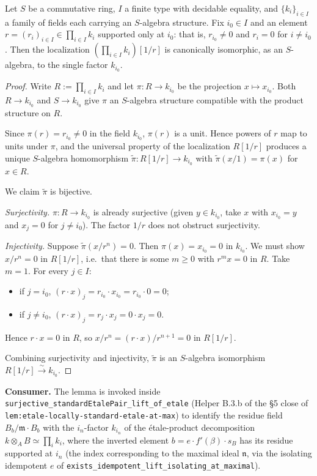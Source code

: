 \begin{theorem}
  \label{thm:localization-away-pi-field-supported-at}
  \leanok
  Let $S$ be a commutative ring, $I$ a finite type with decidable
  equality, and $\{k_i\}_{i \in I}$ a family of fields each carrying
  an $S$-algebra structure. Fix $i_0 \in I$ and an element
  $r = (r_i)_{i \in I} \in \prod_{i \in I} k_i$ supported only at
  $i_0$: that is, $r_{i_0} \neq 0$ and $r_i = 0$ for $i \neq i_0$.
  Then the localization $(\prod_{i \in I} k_i)[1/r]$ is canonically
  isomorphic, as an $S$-algebra, to the single factor $k_{i_0}$.
\end{theorem}
\begin{proof}
  \leanok
  Write $R := \prod_{i \in I} k_i$ and let $\pi : R \to k_{i_0}$ be the
  projection $x \mapsto x_{i_0}$. Both $R \to k_{i_0}$ and $S \to k_{i_0}$
  give $\pi$ an $S$-algebra structure compatible with the product
  structure on $R$.

  Since $\pi(r) = r_{i_0} \neq 0$ in the field $k_{i_0}$, $\pi(r)$ is a
  unit. Hence powers of $r$ map to units under $\pi$, and the universal
  property of the localization $R[1/r]$ produces a unique $S$-algebra
  homomorphism $\widetilde{\pi} : R[1/r] \to k_{i_0}$ with
  $\widetilde{\pi}(x/1) = \pi(x)$ for $x \in R$.

  We claim $\widetilde{\pi}$ is bijective.

  \emph{Surjectivity.} $\pi : R \to k_{i_0}$ is already surjective
  (given $y \in k_{i_0}$, take $x$ with $x_{i_0} = y$ and $x_j = 0$ for
  $j \neq i_0$). The factor $1/r$ does not obstruct surjectivity.

  \emph{Injectivity.} Suppose $\widetilde{\pi}(x/r^n) = 0$. Then
  $\pi(x) = x_{i_0} = 0$ in $k_{i_0}$. We must show $x/r^n = 0$ in
  $R[1/r]$, i.e.\ that there is some $m \geq 0$ with $r^m x = 0$ in $R$.
  Take $m = 1$. For every $j \in I$:
  \begin{itemize}
    \item if $j = i_0$, $(r \cdot x)_j = r_{i_0} \cdot x_{i_0} =
      r_{i_0} \cdot 0 = 0$;
    \item if $j \neq i_0$, $(r \cdot x)_j = r_j \cdot x_j = 0 \cdot x_j
      = 0$.
  \end{itemize}
  Hence $r \cdot x = 0$ in $R$, so $x/r^n = (r \cdot x)/r^{n+1} = 0$
  in $R[1/r]$.

  Combining surjectivity and injectivity, $\widetilde{\pi}$ is an
  $S$-algebra isomorphism $R[1/r] \xrightarrow{\sim} k_{i_0}$.
\end{proof}

\medskip\noindent\textbf{Consumer.} The lemma is invoked inside
\texttt{surjective\_standardEtalePair\_lift\_of\_etale} (Helper B.3.b
of the §5 close of
\texttt{lem:etale-locally-standard-etale-at-max}) to identify the
residue field $B_b / \mathfrak{m} \cdot B_b$ with the $i_n$-factor
$k_{i_n}$ of the étale-product decomposition $k \otimes_A B \simeq
\prod_{i} k_i$, where the inverted element $b = e \cdot f'(\beta)
\cdot s_B$ has its residue supported at $i_n$ (the index corresponding
to the maximal ideal $\mathfrak{n}$, via the isolating idempotent
$e$ of
\texttt{exists\_idempotent\_lift\_isolating\_at\_maximal}).
